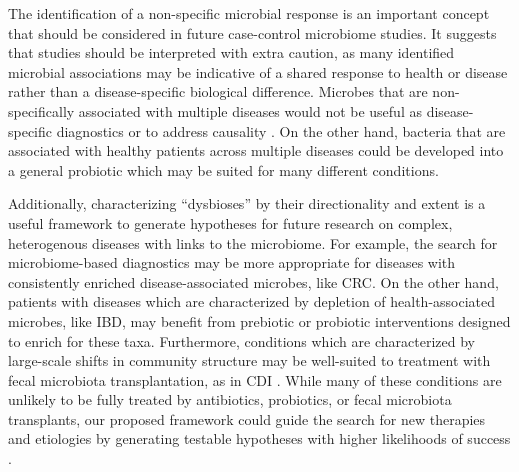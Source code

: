The identification of a non-specific microbial response is an important concept that should be considered in future case-control microbiome studies.
It suggests that studies should be interpreted with extra caution, as many identified microbial associations may be indicative of a shared response to health or disease rather than a disease-specific biological difference.
Microbes that are non-specifically associated with multiple diseases would not be useful as disease-specific diagnostics or to address causality \cite{olesen2016dysbiosis}.
On the other hand, bacteria that are associated with healthy patients across multiple diseases could be developed into a general probiotic which may be suited for many different conditions.

Additionally, characterizing ``dysbioses'' by their directionality and extent is a useful framework to generate hypotheses for future research on complex, heterogenous diseases with links to the microbiome.
For example, the search for microbiome-based diagnostics may be more appropriate for diseases with consistently enriched disease-associated microbes, like CRC.
On the other hand, patients with diseases which are characterized by depletion of health-associated microbes, like IBD, may benefit from prebiotic or probiotic interventions designed to enrich for these taxa.
Furthermore, conditions which are characterized by large-scale shifts in community structure may be well-suited to treatment with fecal microbiota transplantation, as in CDI \cite{cdi-youngster}.
While many of these conditions are unlikely to be fully treated by antibiotics, probiotics, or fecal microbiota transplants, our proposed framework could guide the search for new therapies and etiologies by generating testable hypotheses with higher likelihoods of success \cite{olesen2016dysbiosis}.

